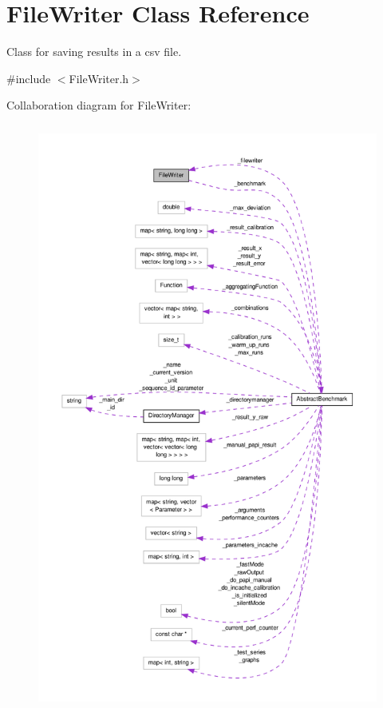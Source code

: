 \hypertarget{classFileWriter}{\section{File\-Writer Class Reference}
\label{classFileWriter}
}


Class for saving results in a csv file.  




{\ttfamily \#include $<$File\-Writer.\-h$>$}



Collaboration diagram for File\-Writer\-:
\nopagebreak
\begin{figure}[H]
\begin{center}
\leavevmode
\includegraphics[height=550pt]{classFileWriter__coll__graph}
\end{center}
\end{figure}
